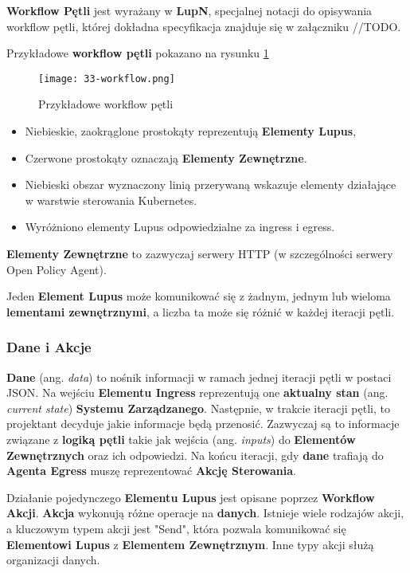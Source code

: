 \textbf{Workflow Pętli} jest wyrażany w \textbf{LupN}, specjalnej notacji do opisywania workflow pętli, której dokładna specyfikacja znajduje się w załączniku //TODO.

Przykładowe \textbf{workflow pętli} pokazano na rysunku \ref{fig:33-workflow}

\begin{figure}[!h]
    \centering \texttt{[image: 33-workflow.png]}
    \caption{Przykładowe workflow pętli}\label{fig:33-workflow}
\end{figure}

\begin{itemize}
    \item Niebieskie, zaokrąglone prostokąty reprezentują \textbf{Elementy Lupus},
    \item Czerwone prostokąty oznaczają \textbf{Elementy Zewnętrzne}.
    \item Niebieski obszar wyznaczony linią przerywaną wskazuje elementy działające w warstwie sterowania Kubernetes. 
    \item Wyróżniono elementy Lupus odpowiedzialne za ingress i egress.
\end{itemize}

\textbf{Elementy Zewnętrzne} to zazwyczaj serwery HTTP (w szczególności serwery Open Policy Agent).

Jeden \textbf{Element Lupus} może komunikować się z żadnym, jednym lub wieloma \textbf{lementami zewnętrznymi}, a liczba ta może się różnić w każdej iteracji pętli.

\subsubsection{Dane i Akcje}

\textbf{Dane} (ang. \textit{data}) to nośnik informacji w ramach jednej iteracji pętli w postaci JSON. Na wejściu \textbf{Elementu Ingress} reprezentują one \textbf{aktualny stan} (ang. \textit{current state}) \textbf{Systemu Zarządzanego}. Następnie, w trakcie iteracji pętli, to projektant decyduje jakie informacje będą przenosić. Zazwyczaj są to informacje związane z \textbf{logiką pętli} takie jak wejścia (ang. \textit{inputs}) do \textbf{Elementów Zewnętrznych} oraz ich odpowiedzi. Na końcu iteracji, gdy \textbf{dane} trafiają do \textbf{Agenta Egress} muszę reprezentować \textbf{Akcję Sterowania}. 

Działanie pojedynczego \textbf{Elementu Lupus} jest opisane poprzez \textbf{Workflow Akcji}. \textbf{Akcja} wykonują różne operacje na \textbf{danych}. Istnieje wiele rodzajów akcji, a kluczowym typem akcji jest "Send", która pozwala komunikować się \textbf{Elementowi Lupus} z \textbf{Elementem Zewnętrznym}. Inne typy akcji służą organizacji danych.

